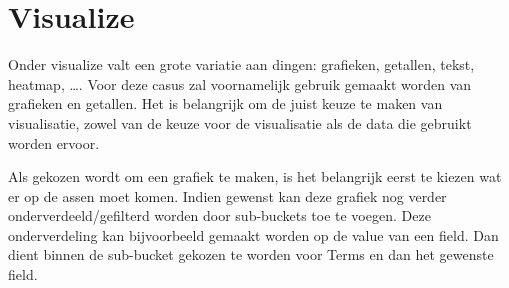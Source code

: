 \section{Visualize}
\label{sec:visualize}

Onder visualize valt een grote variatie aan dingen: grafieken, getallen, tekst, heatmap, \dots. Voor deze casus zal voornamelijk gebruik gemaakt worden van grafieken en getallen.
Het is belangrijk om de juist keuze te maken van visualisatie, zowel van de keuze voor de visualisatie als de data die gebruikt worden ervoor. 

Als gekozen wordt om een grafiek te maken, is het belangrijk eerst te kiezen wat er op de assen moet komen. Indien gewenst kan deze grafiek nog verder onderverdeeld/gefilterd worden door sub-buckets toe te voegen.
Deze onderverdeling kan bijvoorbeeld gemaakt worden op de value van een field. Dan dient binnen de sub-bucket gekozen te worden voor Terms en dan het gewenste field.
